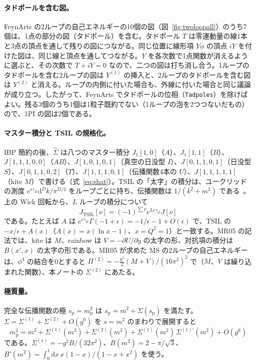 \documentclass[a4paper,10pt]{ltjsarticle}
\newcommand{\dd}{\mathrm{d}}
\begin{document}
\paragraph{タドポールを含む図。}FeynArts の2ループの自己エネルギーの10個の図（図~\ref{fig:twoloopall}）のうち7個は、1点の部分の図（タドポール）を含む。タドポール $T$ は零運動量の線1本と3点の頂点を通して残りの図につながる。同じ位置に線形項 $Y\phi$ の頂点 $iY$ を付けた図は、同じ線と頂点を通してつながる。$Y$ を各次数で1点関数が消えるように選ぶと、その次数で $T+iY=0$ なので、二つの図は打ち消し合う。1ループのタドポールを含む2ループの図は $Y^{(1)}$ の挿入と、2ループのタドポールを含む図は $Y^{(2)}$ と消える。ループの内側に付いた場合も、外線に付いた場合と同じ議論が成り立つ。したがって、FeynArts でタドポールの位相（\texttt{Tadpoles}）を除けばよい。残る3個のうち1個は1粒子既約でない（1ループの泡を2つつないだもの）ので、1PI の図は2個である。

\paragraph{マスター積分と TSIL の規格化。}IBP 簡約の後、$\hat\Sigma$ は八つのマスター積分 $J_1[1,0]$（$A$）、$J_1[1,1]$（$B$）、$J[1,1,1,0,0]$（$AB$）、$J[1,0,1,0,1]$（真空の日没型 $I$）、$J[0,1,1,0,1]$（日没型 $S$）、$J[0,1,1,0,2]$（$T$）、$J[1,1,1,0,1]$（伝播関数4本の $U$）、$J[1,1,1,1,1]$（kite $M$）で書ける（式~\eqref{eq:shat}）。TSIL の「太字」の積分は、ユークリッドの測度 $e^{\epsilon\gamma_E}\dd^Dk/\pi^{D/2}$ をループごとに持ち、伝播関数は $1/(k^2+m^2)$ である~\cite{tsil}。上の Wick 回転から、$L$ ループの積分について
\begin{equation*}
J_{\mathrm{TSIL}}[\nu]=(-1)^{\sum\nu}e^{L\epsilon\gamma_E}J[\nu]
\end{equation*}
である。たとえば $A$ は $e^{\epsilon\gamma_E}\Gamma(-1+\epsilon)=-1/\epsilon-1+O(\epsilon)$ で、TSIL の $-x/\epsilon+A(x)$（$A(x)=x(\ln x-1)$、$x=Q^2=1$）と一致する。MR05 の記法では、kite は $M$、rainbow は $V=-\partial U/\partial y$ の太字の形、対抗項の積分は $B(x',x)$ の太字の形である。MR05 が求めた $\overline{\mathrm{MS}}$ の2ループの自己エネルギーは、$\phi^4$ の結合を0とすると $\Pi^{(2)}=-\frac{g^4}2(M+V)/(16\pi^2)^2$ で（$M$、$V$ は繰り込まれた関数）、本ノートの $\Sigma^{(2)}$ にあたる。

\paragraph{極質量。}完全な伝播関数の極 $s_{\mathrm p}=m_{\mathrm p}^2$ は $s_{\mathrm p}=m^2+\Sigma(s_{\mathrm p})$ を満たす。$\Sigma=\Sigma^{(1)}+\Sigma^{(2)}+O(g^6)$ を $s=m^2$ のまわりで展開すると
\begin{equation*}
m_{\mathrm p}^2=m^2+\Sigma^{(1)}(m^2)+\Sigma^{(2)}(m^2)+\Sigma^{(1)}(m^2)\,\Sigma^{(1)\prime}(m^2)+O(g^6)
\end{equation*}
である。$\Sigma^{(1)}=-g^2B/(32\pi^2)$、$B(m^2)=2-\pi/\sqrt3$、$B'(m^2)=\int_0^1\dd x\,x(1-x)/(1-x+x^2)$ を使う。
\end{document}
